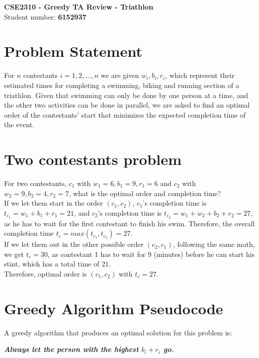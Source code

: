 \documentclass[a4paper,11pt]{article}
\begin{document}
\begin{center}
    {\Large \textbf{CSE2310 - Greedy TA Review - Triathlon}}\\[4pt]
    Student number: \textbf{6152937}
\end{center}

\vspace{1em}

\section*{Problem Statement}
For $n$ contestants $i = 1, 2, \dots , n$ we are given $w_i, b_i, r_i$, which represent their estimated times for completing a swimming, biking and running section of a triathlon. Given that swimming can only be done by one person at a time, and the other two activities can be done in parallel, we are asked to find an optimal order of the contestants' start that minimizes the expected completion time of the event.

\section{Two contestants problem}
For two contestants, $c_1$ with $w_1 = 6, b_1 = 9, r_1 = 6$ and $c_2$ with $w_2 = 9, b_2 = 4, r_2 = 7$, what is the optimal order and completion time?\\
If we let them start in the order $(c_1, c_2)$, $c_1$'s completion time is $t_{c_1} = w_1 + b_1 + r_1 = 21$, and $c_2$'s completion time is $t_{c_2} = w_1 + w_2 + b_2 + r_2 = 27$, as he has to wait for the first contestant to finish his swim. Therefore, the overall completion time $t_c = max(t_{c_1}, t_{c_2}) = 27$.\\
If we let them out in the other possible order $(c_2, c_1)$, following the same math, we get $t_c = 30$, as contestant 1 has to wait for $9$ (minutes) before he can start his stint, which has a total time of $21$.\\
Therefore, optimal order is $(c_1, c_2)$ with $t_c = 27$.

\section{Greedy Algorithm Pseudocode}
A greedy algorithm that produces an optimal solution for this problem is:
\begin{center}
    \textbf{\textit{Always let the person with the highest $b_i + r_i$ go.}}
\end{center}
\end{document}
